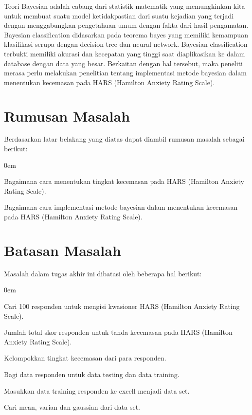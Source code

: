 \documentclass{jtetiproposalskripsi}
\begin{document}
Teori Bayesian adalah cabang dari statistik matematik yang memungkinkan kita untuk membuat suatu model ketidakpastian dari suatu kejadian yang terjadi dengan menggabungkan pengetahuan umum dengan fakta dari hasil pengamatan. Bayesian classification didasarkan pada teorema bayes yang memiliki kemampuan klasifikasi serupa dengan decision tree dan neural network. Bayesian classification terbukti memiliki akurasi dan kecepatan yang tinggi saat diaplikasikan ke dalam database dengan data yang besar.	 Berkaitan dengan hal tersebut, maka peneliti merasa perlu melakukan penelitian tentang implementasi metode bayesian dalam menentukan kecemasan pada  HARS (Hamilton Anxiety Rating Scale). 



\section{Rumusan Masalah}
Berdasarkan latar belakang yang diatas dapat diambil rumusan masalah sebagai berikut:
\begin{enumerate}[a.]
\begin{singlespace}
\itemsep0em
\item Bagaimana cara menentukan tingkat kecemasan pada  HARS (Hamilton Anxiety Rating Scale).
\item Bagaimana cara implementasi metode bayesian dalam menentukan kecemasan pada  HARS (Hamilton Anxiety Rating Scale).  
\end{singlespace}
\end{enumerate} 
   
\section{Batasan Masalah}
Masalah dalam tugas akhir ini dibatasi oleh beberapa hal berikut:
\begin{enumerate}[a.]
\begin{singlespace}
\itemsep0em
\item Cari 100 responden untuk mengisi kwasioner HARS (Hamilton Anxiety Rating Scale). 
\item Jumlah total skor responden untuk tanda kecemasan pada HARS (Hamilton Anxiety Rating Scale).
\item Kelompokkan tingkat kecemasan dari para responden.
\item Bagi data responden untuk data testing dan data training.
\item Masukkan data training responden ke excell menjadi data set.
\item Cari mean, varian dan gaussian dari data set.
\end{singlespace}
\end{enumerate}
\end{document}
